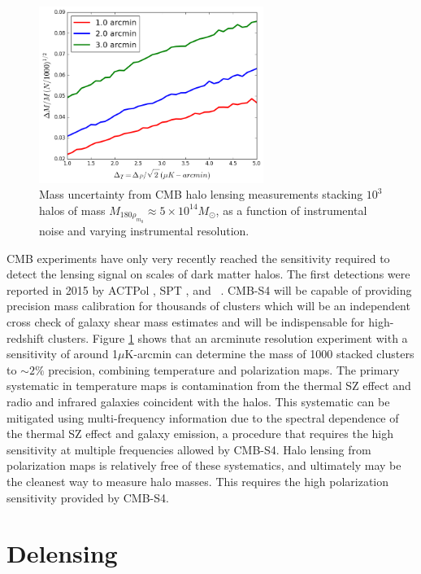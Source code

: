 \begin{figure}[htbp]
\centering 
\includegraphics[width=0.65\textwidth]{CMBLensing/HaloLens.png}
\caption{Mass uncertainty from CMB halo lensing measurements stacking $10^3$ halos of mass $M_{180\rho_{m_0}} \approx 5\times 10^{14} M_{\odot}$, as a function of instrumental noise and varying instrumental resolution.}
\label{haloLens}
\end{figure}

CMB experiments have only very recently reached the sensitivity required to detect the lensing signal on scales of dark matter halos.  The first detections were reported in 2015 by ACTPol \cite{Madhavacheril:2014slf}, SPT \cite{Baxter:2014frs}, and \planck\ \cite{Ade:2015fva}.  CMB-S4 will be capable of providing precision mass calibration for thousands of clusters which will be an independent cross check of galaxy shear mass estimates and will be indispensable for high-redshift clusters. Figure \ref{haloLens} shows that an arcminute resolution experiment with a sensitivity of around 1$\mu$K-arcmin can determine the mass of 1000 stacked clusters to $\sim 2\%$ precision, combining temperature and polarization maps. The primary systematic in temperature maps is contamination from the thermal SZ effect and radio and infrared galaxies coincident with the halos. This systematic can be mitigated using multi-frequency information due to the spectral dependence of the thermal SZ effect and galaxy emission, a procedure that requires the high sensitivity at multiple frequencies allowed by CMB-S4.  Halo lensing from polarization maps is relatively free of these systematics, and ultimately may be the cleanest way to measure halo masses.  This requires the high polarization sensitivity provided by CMB-S4. 


\section{Delensing}\label{delens}

